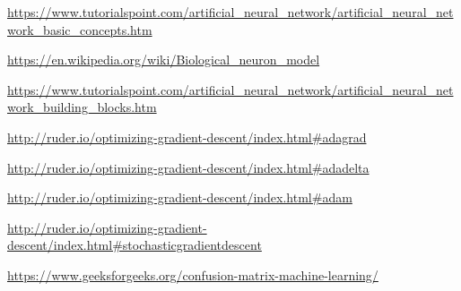 \documentclass{report}
\begin{document}
\begin{thebibliography}{9} 
 
\medskip
 
\href{https://www.tutorialspoint.com/artificial_neural_network/artificial_neural_network_basic_concepts.htm}{https://www.tutorialspoint.com/artificial_neural_network/artificial_neural_network_basic_concepts.htm} 

\href{https://en.wikipedia.org/wiki/Biological_neuron_model}{https://en.wikipedia.org/wiki/Biological_neuron_model}

\href{https://www.tutorialspoint.com/artificial_neural_network/artificial_neural_network_building_blocks.htm}{https://www.tutorialspoint.com/artificial_neural_network/artificial_neural_network_building_blocks.htm}

\href{http://ruder.io/optimizing-gradient-descent/index.html#adagrad}{http://ruder.io/optimizing-gradient-descent/index.html#adagrad}

\href{http://ruder.io/optimizing-gradient-descent/index.html#adadelta}{http://ruder.io/optimizing-gradient-descent/index.html#adadelta}


\href{http://ruder.io/optimizing-gradient-descent/index.html#adam}{http://ruder.io/optimizing-gradient-descent/index.html#adam}

\href{http://ruder.io/optimizing-gradient-descent/index.html#stochasticgradientdescent}{http://ruder.io/optimizing-gradient-descent/index.html#stochasticgradientdescent}

\href{https://www.geeksforgeeks.org/confusion-matrix-machine-learning/}{https://www.geeksforgeeks.org/confusion-matrix-machine-learning/}


\end{thebibliography}
 




\end{document}
